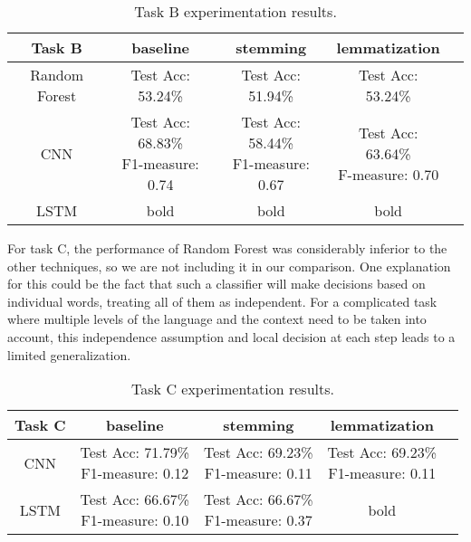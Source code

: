 \documentclass[11pt,a4paper]{article}
\begin{document}
\begin{table*}[!hbp]
\begin{center}
\begin{tabular}{|c|cccc|}
\hline \bf Task B & \bf baseline & \bf stemming & \bf lemmatization & \\ \hline
Random Forest & Test Acc: 53.24\% & Test Acc: 51.94\% & Test Acc: 53.24\% & \\ \hline
CNN & \shortstack{Test Acc: 68.83\% \\ F1-measure: 0.74}  & \shortstack{Test Acc: 58.44\% \\ F1-measure: 0.67} & \shortstack{Test Acc: 63.64\% \\ F-measure: 0.70} & \\ \hline
LSTM & bold & bold & bold & \\
\hline
\end{tabular}
\end{center}
\caption{\label{font-table} Task B experimentation results.}
\label{table:2}
\end{table*}


For task C, the performance of Random Forest was considerably inferior to the other techniques, so we are not including it in our comparison. One explanation for this could be the fact that such a classifier will make decisions based on individual words, treating all of them as independent. For a complicated task where multiple levels of the language and the context need to be taken into account, this independence assumption and local decision at each step leads to a limited generalization.

\begin{table*}[!hbp]
\begin{center}
\begin{tabular}{|c|cccc|}
\hline \bf Task C & \bf baseline & \bf stemming & \bf lemmatization & \\ \hline
CNN & \shortstack{Test Acc: 71.79\% \\ F1-measure: 0.12}  & \shortstack{Test Acc: 69.23\% \\ F1-measure: 0.11} & \shortstack{Test Acc: 69.23\% \\ F1-measure: 0.11} & \\ \hline
LSTM & \shortstack{Test Acc: 66.67\% \\ F1-measure: 0.10} & \shortstack{Test Acc: 66.67\% \\ F1-measure: 0.37} & bold & \\
\hline
\end{tabular}
\end{center}
\caption{\label{font-table} Task C experimentation results.}
\label{table:3}
\end{table*}
\end{document}
